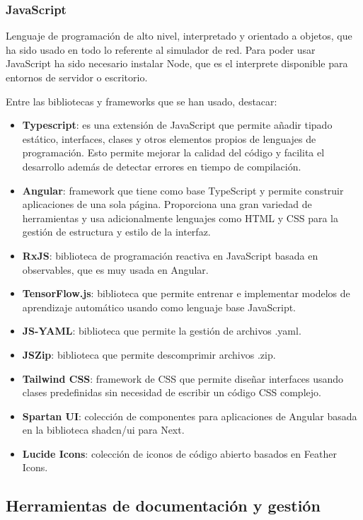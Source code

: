 \subsubsection{JavaScript}
\label{subsubsec:JavaScript}
Lenguaje de programación de alto nivel, interpretado y orientado a objetos, que ha sido usado en todo lo referente al simulador de red. Para poder usar JavaScript ha sido necesario instalar Node, que es el interprete disponible para entornos de servidor o escritorio.

Entre las bibliotecas y frameworks que se han usado, destacar:
\begin{itemize}
    \item \textbf{Typescript}: es una extensión de JavaScript que permite añadir tipado estático, interfaces, clases y otros elementos propios de lenguajes de programación. Esto permite mejorar la calidad del código y facilita el desarrollo además de detectar errores en tiempo de compilación.
    \item \textbf{Angular}: framework que tiene como base TypeScript y permite construir aplicaciones de una sola página. Proporciona una gran variedad de herramientas y usa adicionalmente lenguajes como HTML y CSS para la gestión de estructura y estilo de la interfaz.
    \item \textbf{RxJS}: biblioteca de programación reactiva en JavaScript basada en observables, que es muy usada en Angular. 
    \item \textbf{TensorFlow.js}: biblioteca que permite entrenar e implementar modelos de aprendizaje automático usando como lenguaje base JavaScript.
    \item \textbf{JS-YAML}: biblioteca que permite la gestión de archivos .yaml.
    \item \textbf{JSZip}: biblioteca que permite descomprimir archivos .zip.
    \item \textbf{Tailwind CSS}: framework de CSS que permite diseñar interfaces usando clases predefinidas sin necesidad de escribir un código CSS complejo.
    \item \textbf{Spartan UI}: colección de componentes para aplicaciones de Angular basada en la biblioteca shadcn/ui para Next.
    \item \textbf{Lucide Icons}: colección de iconos de código abierto basados en Feather Icons.
\end{itemize}

\subsection{Herramientas de documentación y gestión}
\label{subsec:Gestion}
